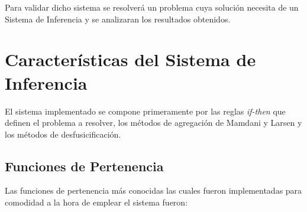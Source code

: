 \documentclass[a4paper,10pt,twocolumn]{article}
\begin{document}
Para validar dicho sistema se resolver\'a un problema cuya soluci\'on necesita de un Sistema de Inferencia y se analizaran los resultados obtenidos. 

\section*{Caracter\'isticas del Sistema de Inferencia }

El sistema implementado se compone primeramente por las reglas \textit{if-then} que definen el problema a resolver, los m\'etodos de agregaci\'on de Mamdani y Larsen y los m\'etodos de desfusicificaci\'on.

\subsection*{Funciones de Pertenencia}

Las funciones de pertenencia m\'as conocidas las cuales fueron implementadas para comodidad a la hora de emplear el sistema fueron:
\end{document}
